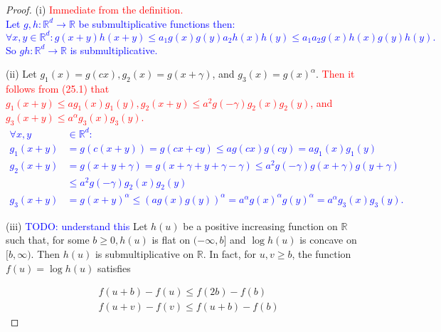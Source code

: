 \documentclass[a4paper,11pt]{article}
\begin{document}
\begin{proof}

    (i) \textcolor{red}{Immediate from the definition. \\}
    \textcolor{blue}{
    Let $g,h:\mathbb{R}^{d}\rightarrow \mathbb{R}$ be submultiplicative functions then:
    $$
        \forall x,y \in \mathbb{R}^{d}: g(x+y)h(x+y) \le a_{1} g(x)g(y) a_{2} h(x)h(y) \leq a_{1}a_{2} g(x)h(x)g(y)h(y).
    $$
    So $gh:\mathbb{R}^{d}\rightarrow \mathbb{R}$ is submultiplicative.\\
    }

    (ii)
    Let $g_{1}(x)=g(c x), g_{2}(x)=g(x+\gamma)$, and $g_{3}(x)=g(x)^{\alpha}$.
    \textcolor{red}{Then it follows from (25.1) that $g_{1}(x+y) \leq a g_{1}(x) g_{1}(y), g_{2}(x+y) \leq
            a^{2} g(-\gamma) g_{2}(x) g_{2}(y)$, and $g_{3}(x+y) \leq a^{\alpha} g_{3}(x) g_{3}(y)$. }
    \textcolor{blue}{
        \begin{align*}
            \forall x,y & \in \mathbb{R}^{d}:                                                                                                                 \\
            g_{1}(x+y)  & = g(c(x+y)) = g(c x + c y) \leq a g(c x) g(c y) = a g_{1}(x) g_{1}(y)                                                               \\
            g_{2}(x+y)  & = g(x + y + \gamma) = g(x + \gamma + y + \gamma - \gamma)
            \le a^{2} g(-\gamma) g(x+\gamma) g(y + \gamma)                                                                                                    \\
                        & \le a^{2} g(-\gamma) g_{2}( x)g_{2}(y)                                                                                              \\
            g_{3}(x+y)  & = g(x+y) ^{\alpha} \le \left(a g(x) g(y) \right) ^{\alpha}= a^{\alpha} g(x)^{\alpha} g(y)^{\alpha} = a^{\alpha} g_{3}(x) g_{3}(y) .
        \end{align*}
    }

    (iii)
    \textcolor{blue}{ TODO: understand this}
    Let $h(u)$ be a positive increasing function on $\mathbb{R}$ such that, for some
    $b \geq 0, h(u)$ is flat on $(-\infty, b]$ and $\log h(u)$ is concave on $[b, \infty)$. Then
    $h(u)$ is submultiplicative on $\mathbb{R}$. In fact, for $u, v \geq b$, the function $f(u)=\log h(u)$ satisfies

    $$
        \begin{aligned}
             & f(u+b)-f(u) \leq f(2 b)-f(b) \\
             & f(u+v)-f(v) \leq f(u+b)-f(b)
        \end{aligned}
    $$


\end{proof}
\end{document}
